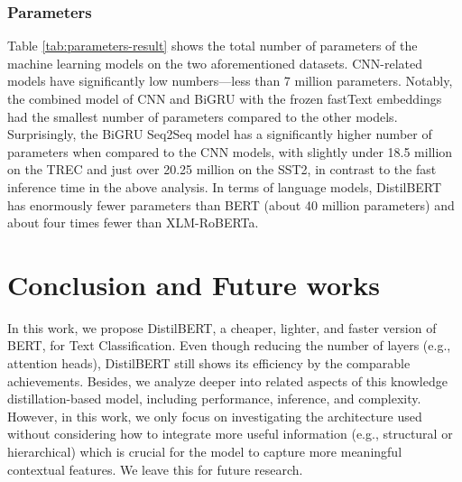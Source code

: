 \documentclass[sn-mathphys,Numbered]{sn-jnl}%
\theoremstyle{thmstyleone}%
\theoremstyle{thmstyletwo}%
\theoremstyle{thmstylethree}%
\begin{document}
\subsubsection{Parameters}
Table \ref{tab:parameters-result} shows the total number of parameters of the machine learning models on the two aforementioned datasets. CNN-related models have significantly low numbers—less than 7 million parameters. Notably, the combined model of CNN and BiGRU with the frozen fastText embeddings had the smallest number of parameters compared to the other models. Surprisingly, the BiGRU Seq2Seq model has a significantly higher number of parameters when compared to the CNN models, with slightly under 18.5 million on the TREC and just over 20.25 million on the SST2, in contrast to the fast inference time in the above analysis. In terms of language models, DistilBERT has enormously fewer parameters than BERT (about 40 million parameters) and about four times fewer than XLM-RoBERTa.

\section{Conclusion and Future works}\label{conclusionandfutureworks}
In this work, we propose DistilBERT, a cheaper, lighter, and faster version of BERT, for Text Classification. Even though reducing the number of layers (e.g., attention heads), DistilBERT still shows its efficiency by the comparable achievements. Besides, we analyze deeper into related aspects of this knowledge distillation-based model, including performance, inference, and complexity. However, in this work, we only focus on investigating the architecture used without considering how to integrate more useful information (e.g., structural or hierarchical) which is crucial for the model to capture more meaningful contextual features. We leave this for future research.


\end{document}
